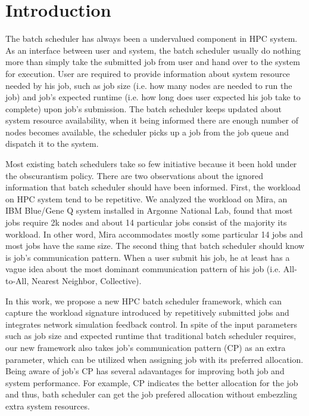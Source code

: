 \documentclass[conference]{IEEEtran}
\begin{document}
\IEEEpeerreviewmaketitle




\section{Introduction} 
\label{sec: intro} 


The batch scheduler has always been a undervalued component in HPC system. As an interface between user and system, the batch scheduler usually do nothing more than simply take the submitted job from user and hand over to the system for execution. User are required to provide information about system resource needed by his job, such as job size (i.e. how many nodes are needed to run the job) and job's expected runtime (i.e. how long does user expected his job take to complete) upon job's submission. The batch scheduler keeps updated about system resource availability, when it being informed there are enough number of nodes becomes available, the scheduler picks up a job from the job queue and dispatch it to the system.

Most existing batch schedulers take so few initiative  because it been hold under the obscurantism policy. There are two observations about the ignored information that batch scheduler should have been informed. First, the workload on HPC system tend to be repetitive. We analyzed the workload on Mira, an IBM Blue/Gene Q system installed in Argonne National Lab, found that most jobs require 2k nodes and about 14 particular jobs consist of the majority its workload. In other word, Mira accommodates mostly some particular 14 jobs and most jobs have the same size. The second thing that batch scheduler should know is job's communication pattern. When a user submit his job, he at least has a vague idea about the most dominant communication pattern of his job (i.e. All-to-All, Nearest Neighbor, Collective).

In this work, we propose a new HPC batch scheduler framework, which can capture the workload signature introduced by repetitively submitted jobs and  integrates network simulation feedback control. In spite of the input parameters such as job size and expected runtime that traditional batch scheduler requires, our new framework also takes job's communication pattern (CP) as an extra parameter, which can be utilized when assigning job with its preferred allocation. Being aware of job's CP has several adavantages for improving both job and system performance. For example, CP indicates the better allocation for the job and thus, bath scheduler can get the job prefered allocation without embezzling extra system resources. 
\end{document}
